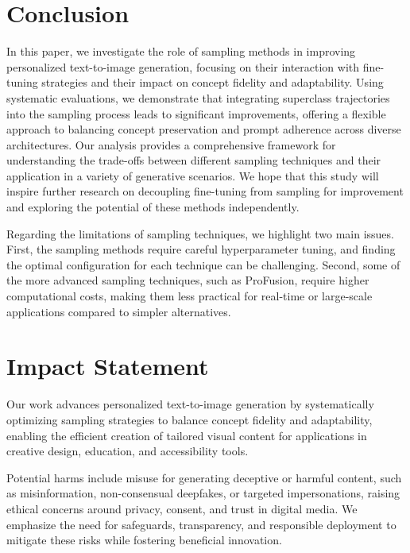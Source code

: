 \section{Conclusion}
\label{sec:conclusion}

In this paper, we investigate the role of sampling methods in improving personalized text-to-image generation, focusing on their interaction with fine-tuning strategies and their impact on concept fidelity and adaptability. Using systematic evaluations, we demonstrate that integrating superclass trajectories into the sampling process leads to significant improvements, offering a flexible approach to balancing concept preservation and prompt adherence across diverse architectures. Our analysis provides a comprehensive framework for understanding the trade-offs between different sampling techniques and their application in a variety of generative scenarios. We hope that this study will inspire further research on decoupling fine-tuning from sampling for improvement and exploring the potential of these methods independently.

Regarding the limitations of sampling techniques, we highlight two main issues. First, the sampling methods require careful hyperparameter tuning, and finding the optimal configuration for each technique can be challenging. Second, some of the more advanced sampling techniques, such as ProFusion, require higher computational costs, making them less practical for real-time or large-scale applications compared to simpler alternatives.


\clearpage

\section*{Impact Statement}
Our work advances personalized text-to-image generation by systematically optimizing sampling strategies to balance concept fidelity and adaptability, enabling the efficient creation of tailored visual content for applications in creative design, education, and accessibility tools. 

Potential harms include misuse for generating deceptive or harmful content, such as misinformation, non-consensual deepfakes, or targeted impersonations, raising ethical concerns around privacy, consent, and trust in digital media. We emphasize the need for safeguards, transparency, and responsible deployment to mitigate these risks while fostering beneficial innovation.
